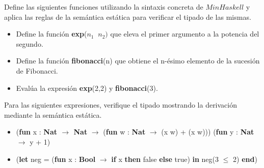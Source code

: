     \begin{exercise}
        Define las siguientes funciones utilizando la sintaxis concreta de $MinHaskell$ y aplica las reglas de la semántica estática para verificar el tipado de las mismas.
        \begin{itemize}
            \item Define la función \textbf{exp}($n_1\ $ $n_2)$ que eleva el primer argumento a la potencia del segundo.
            \item Define la función \textbf{fibonacci}(n) que obtiene el n-ésimo elemento de la sucesión de Fibonacci.
            \item Evalúa la expresión \textbf{exp}(2,2) y \textbf{fibonacci}(3).
        \end{itemize}
    \end{exercise}

    \begin{exercise}
        Para las siguientes expresiones, verifique el tipado mostrando la derivación mediante la semántica estática.
        \begin{itemize}
            \item (\textbf{fun} x : \textbf{Nat $\to$ Nat} $\rightarrow$ (\textbf{fun} w : \textbf{Nat} $\rightarrow$ (x w) + (x w))) (\textbf{fun} y : \textbf{Nat} $\rightarrow$ y + 1) 
            \item (\textbf{let} neg = (\textbf{fun} x : \textbf{Bool} $\rightarrow$ \textbf{if } x \textbf{then } false \textbf{else} true) \textbf{in} neg(3 $\leq$ 2) \textbf{end})
        \end{itemize}
    \end{exercise}


